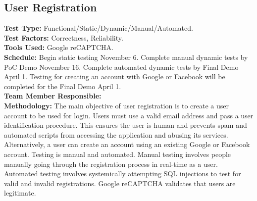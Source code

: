 \documentclass[12pt]{article}
\begin{document}
\subsection{User Registration} 
\textbf{Test Type:} Functional/Static/Dynamic/Manual/Automated. \\
\textbf{Test Factors:} Correctness, Reliability. \\
\textbf{Tools Used:} Google reCAPTCHA. \\
\textbf{Schedule:} Begin static testing November 6. Complete manual dynamic tests by PoC Demo November 16. Complete automated dynamic tests by Final Demo April 1. Testing for creating an account with Google or Facebook will be completed for the Final Demo April 1. \\
\textbf{Team Member Responsible:} \\
\textbf{Methodology:} The main objective of user registration is to create a user account to be used for login. Users must use a valid email address and pass a user identification procedure. This ensures the user is human and prevents spam and automated scripts from accessing the application and abusing its services. Alternatively, a user can create an account using an existing Google or Facebook account. Testing is manual and automated. Manual testing involves people manually going through the registration process in real-time as a user. Automated testing involves systemically attempting SQL injections to test for valid and invalid registrations. Google reCAPTCHA validates that users are legitimate.
\end{document}
